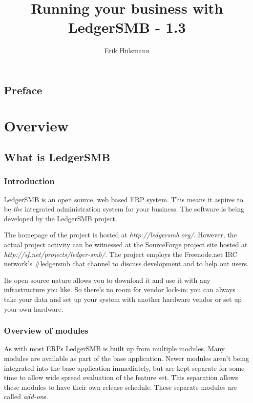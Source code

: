 \documentclass[10pt,A4]{book}
\begin{document}
\author{Erik H\"ulsmann}
\title{Running your business with LedgerSMB - 1.3}


\maketitle


\tableofcontents



\chapter*{Preface}

\part{Overview}

\chapter{What is LedgerSMB}

\section{Introduction}
LedgerSMB is an open source, web based ERP system. This means it aspires to be
\textit{the} integrated administration system for your business.
The software is being developed by the LedgerSMB project.

The homepage of the project is hosted at \textit{http://ledgersmb.org/}.
However, the actual project activity can be witnessed at the SourceForge
project site hosted at \textit{http://sf.net/projects/ledger-smb/}.  The project
employs the Freenode.net IRC network's \#ledgersmb chat channel to discuss development
and to help out users.

Its open source nature allows you to download it and use it with any
infrastructure you like. So there's no room for vendor lock-in: you can
always take your data and set up your system with another hardware vendor
or set up your own hardware.

\section{Overview of modules}
\label{sec:ModuleOverview}
As with most ERPs LedgerSMB is built up from multiple modules.  Many modules are
available as part of the base application.  Newer modules aren't being integrated
into the base application immediately, but are kept separate for some time to allow
wide spread evaluation of the feature set.  This separation allows these modules
to have their own release schedule.  These separate modules are called \textit{add-on}s.
\end{document}
